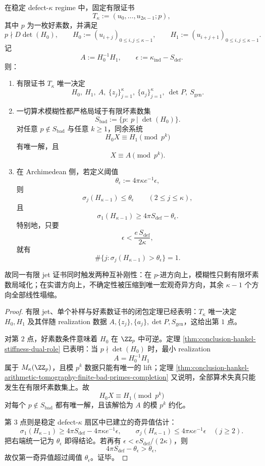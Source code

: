 \begin{theorem}\label{thm:conclusion-finitejet-goodprime-archimedean-codimone-collapse}
在稳定 defect-\(\kappa\) regime 中，固定有限证书
\[
T_\kappa:=(u_0,\dots,u_{2\kappa-1};p),
\]
其中 \(p\) 为一枚好素数，并满足
\[
p\nmid D\det(H_0),\qquad
H_0:=(u_{i+j})_{0\le i,j\le \kappa-1},
\qquad
H_1:=(u_{i+j+1})_{0\le i,j\le \kappa-1}.
\]
记
\[
A:=H_0^{-1}H_1,\qquad
\epsilon:=\kappa_{\mathrm{ind}}-S_{\mathrm{def}}.
\]
则：
\begin{enumerate}
  \item 有限证书 \(T_\kappa\) 唯一决定
  \[
  H_0,\ H_1,\ A,\ \{z_j\}_{j=1}^{\kappa},\ \{a_j\}_{j=1}^{\kappa},\ \det P,\ S_{\mathrm{gen}}.
  \]
  \item 一切算术模糊性都严格局域于有限坏素数集
  \[
  S_{\mathrm{bad}}:=\{p:\ p\mid \det(H_0)\}.
  \]
  对任意 \(p\notin S_{\mathrm{bad}}\) 与任意 \(k\ge 1\)，同余系统
  \[
  H_0X\equiv H_1 \pmod{p^k}
  \]
  有唯一解，且
  \[
  X\equiv A \pmod{p^k}.
  \]
  \item 在 Archimedean 侧，若定义阈值
  \[
  \theta_\epsilon:=4\pi\kappa e^{-1}\epsilon,
  \]
  则
  \[
  \sigma_j(H_{\kappa-1})\le \theta_\epsilon\qquad (2\le j\le \kappa),
  \]
  且
  \[
  \sigma_1(H_{\kappa-1})\ge 4\pi S_{\mathrm{def}}-\theta_\epsilon.
  \]
  特别地，只要
  \[
  \epsilon< \frac{e\,S_{\mathrm{def}}}{2\kappa},
  \]
  就有
  \[
  \#\{j:\sigma_j(H_{\kappa-1})>\theta_\epsilon\}=1.
  \]
\end{enumerate}
故同一有限 jet 证书同时触发两种互补刚性：在 \(p\)-进方向上，模糊性只剩有限坏素数局域化；在实谱方向上，不确定性被压缩到唯一宏观奇异方向，其余 \(\kappa-1\) 个方向全部线性塌缩。
\end{theorem}

\begin{proof}
有限 jet、单个补样与好素数证书的闭包定理已经表明：\(T_\kappa\) 唯一决定 \(H_0,H_1\) 及其伴随 realization 数据 \(A,\{z_j\},\{a_j\},\det P,S_{\mathrm{gen}}\)，这给出第 \(1\) 点。

对第 \(2\) 点，好素数条件意味着 \(H_0\) 在 \(\ZZ_p\) 中可逆。定理 \ref{thm:conclusion-hankel-stiffness-dual-role} 已表明：当 \(p\nmid \det(H_0)\) 时，最小 realization
\[
A=H_0^{-1}H_1
\]
属于 \(M_\kappa(\ZZ_p)\)，且模 \(p^k\) 数据只能有唯一的 lift；定理 \ref{thm:conclusion-hankel-arithmetic-tomography-finite-bad-primes-completion} 又说明，全部算术失真只能发生在有限坏素数集上。故
\[
H_0X\equiv H_1\pmod{p^k}
\]
对每个 \(p\notin S_{\mathrm{bad}}\) 都有唯一解，且该解恰为 \(A\) 的模 \(p^k\) 约化。

第 \(3\) 点则是稳定 defect-\(\kappa\) 扇区中已建立的奇异值估计：
\[
\sigma_1(H_{\kappa-1})\ge 4\pi S_{\mathrm{def}}-4\pi\kappa e^{-1}\epsilon,
\qquad
\sigma_j(H_{\kappa-1})\le 4\pi\kappa e^{-1}\epsilon\quad (j\ge 2).
\]
把右端统一记为 \(\theta_\epsilon\) 即得结论。若再有 \(\epsilon<eS_{\mathrm{def}}/(2\kappa)\)，则
\[
4\pi S_{\mathrm{def}}-\theta_\epsilon>\theta_\epsilon,
\]
故仅第一奇异值超过阈值 \(\theta_\epsilon\)。证毕。
\end{proof}


